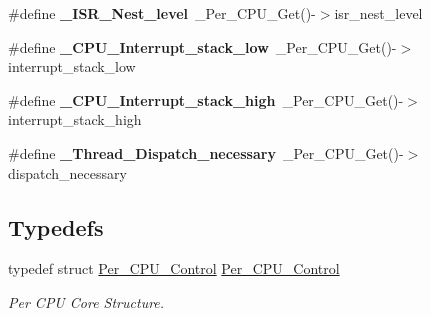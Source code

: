 \begin{DoxyCompactItemize}
\item 
\mbox{\label{group__PerCPU_ga2881c2196850d5341a388a72307ec754}} 
\#define {\bfseries \+\_\+\+I\+S\+R\+\_\+\+Nest\+\_\+level}~\+\_\+\+Per\+\_\+\+C\+P\+U\+\_\+\+Get()-\/$>$isr\+\_\+nest\+\_\+level
\item 
\mbox{\label{group__PerCPU_ga9df0c0abc224c38c2c5e9984595f2b57}} 
\#define {\bfseries \+\_\+\+C\+P\+U\+\_\+\+Interrupt\+\_\+stack\+\_\+low}~\+\_\+\+Per\+\_\+\+C\+P\+U\+\_\+\+Get()-\/$>$interrupt\+\_\+stack\+\_\+low
\item 
\mbox{\label{group__PerCPU_ga50162672d4717b5a55b63f1194eedc11}} 
\#define {\bfseries \+\_\+\+C\+P\+U\+\_\+\+Interrupt\+\_\+stack\+\_\+high}~\+\_\+\+Per\+\_\+\+C\+P\+U\+\_\+\+Get()-\/$>$interrupt\+\_\+stack\+\_\+high
\item 
\mbox{\label{group__PerCPU_gac644dc63788b9a806dba420eef735637}} 
\#define {\bfseries \+\_\+\+Thread\+\_\+\+Dispatch\+\_\+necessary}~\+\_\+\+Per\+\_\+\+C\+P\+U\+\_\+\+Get()-\/$>$dispatch\+\_\+necessary
\end{DoxyCompactItemize}
\subsection*{Typedefs}
\begin{DoxyCompactItemize}
\item 
typedef struct \mbox{\hyperlink{structPer__CPU__Control}{Per\+\_\+\+C\+P\+U\+\_\+\+Control}} \mbox{\hyperlink{group__PerCPU_ga206935ee396e0bd5bedf80098a07578b}{Per\+\_\+\+C\+P\+U\+\_\+\+Control}}
\begin{DoxyCompactList}\small\item\em Per C\+PU Core Structure. \end{DoxyCompactList}\end{DoxyCompactItemize}
